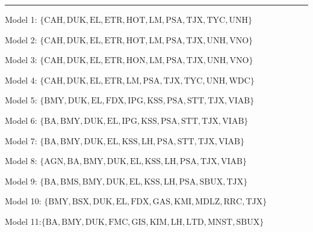 \hrule

\vspace*{6pt}


{\small
  Model 1: $\{\mathrm{CAH, DUK, EL, ETR, HOT, LM, PSA, TJX, TYC, UNH}\}$

  Model 2: $\{\mathrm{CAH, DUK, EL, ETR, HOT, LM, PSA, TJX, UNH, VNO}\}$

  Model 3: $\{\mathrm{CAH, DUK, EL, ETR, HON, LM, PSA, TJX, UNH, VNO}\}$

  Model 4: $\{\mathrm{CAH, DUK, EL, ETR, LM, PSA, TJX, TYC, UNH, WDC}\}$

  Model 5: $\{\mathrm{BMY, DUK, EL, FDX, IPG, KSS, PSA, STT, TJX, VIAB}\}$

  Model 6: $\{\mathrm{BA, BMY, DUK, EL, IPG, KSS, PSA, STT, TJX, VIAB}\}$

  Model 7: $\{\mathrm{BA, BMY, DUK, EL, KSS, LH, PSA, STT, TJX, VIAB}\}$

  Model 8: $\{\mathrm{AGN, BA, BMY, DUK, EL, KSS, LH, PSA, TJX, VIAB}\}$

  Model 9: $\{\mathrm{BA, BMS, BMY, DUK, EL, KSS, LH, PSA, SBUX, TJX}\}$

  Model 10: $\{\mathrm{BMY, BSX, DUK, EL, FDX, GAS, KMI, MDLZ, RRC, TJX}\}$

  Model 11:$\{\mathrm{BA, BMY, DUK, FMC, GIS, KIM, LH, LTD, MNST, SBUX}\}$
}

\pagebreak

